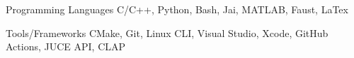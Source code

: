 

\begin{cvskills}

  \cvskill
    {Programming Languages} %
    {C/C++, Python, Bash, Jai, MATLAB, Faust, LaTex} %

    \cvskill
    {Tools/Frameworks} %
    {CMake, Git, Linux CLI, Visual Studio, Xcode, GitHub Actions, JUCE API, CLAP} %


\end{cvskills}
